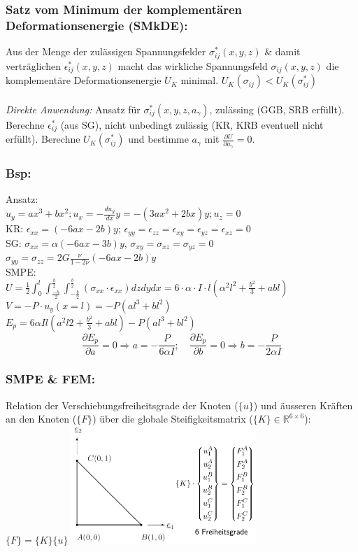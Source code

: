 \documentclass[a4paper,10pt]{article}
\begin{document}
\begin{multicols}{3}
        \subsubsection{Satz vom Minimum der komplementären Deformationsenergie (SMkDE):}
            Aus der Menge der zulässigen Spannungsfelder $\sigma_{ij}^*(x,y,z)$ \& damit verträglichen $\epsilon_{ij}^*(x,y,z)$ macht das wirkliche Spannungsfeld $\sigma_{ij}(x,y,z)$ die komplementäre Deformationsenergie $U_K$ minimal. $U_K(\sigma_{ij}) < U_K(\sigma_{ij}^*)$\\\\
            \textit{Direkte Anwendung:} Ansatz für $\sigma_{ij}^*(x,y,z,a_\gamma)$, zulässing (GGB, SRB erfüllt). Berechne $\epsilon_{ij}^*$ (aus SG), nicht unbedingt zulässig (KR, KRB eventuell nicht erfüllt). Berechne $U_K(\sigma_{ij}^*)$ und bestimme $a_\gamma$ mit $\frac{\partial U}{\partial a_\gamma}=0$.
        \subsubsection{Bsp:}
            Ansatz:\\
            $u_y=ax^3+bx^2; u_x=-\frac{du_y}{dx}y= -(3ax^2+2bx)y; u_z = 0$\\
            KR: $\epsilon_{xx} =(-6ax-2b)y$; $\epsilon_{yy}=\epsilon_{zz}=\epsilon_{xy}=\epsilon_{yz} = \epsilon_{xz}=0$\\
            SG: $\sigma_{xx} = \alpha(-6ax-3b)y$, $\sigma_{xy}=\sigma_{xz}=\sigma_{yz}=0$\\ $\sigma_{yy}=\sigma_{zz}=2G\frac{\nu}{1-2\nu}(-6ax-2b)y$\\
            SMPE:\\
            $U=\frac{1}{2}\int_0^l\int_\frac{-h}{2}^\frac{h}{2}\int_{-\frac{b}{2}}^\frac{b}{2}(\sigma_{xx}\cdot\epsilon_{xx})dzdydx=6\cdot\alpha\cdot I\cdot l(\alpha^2l^2+\frac{b^2}{3}+abl)$\\
            $V=-P\cdot u_y(x=l)=-P(al^3+bl^2)$\\
            $E_p=6\alpha Il(a^2l2+\frac{b^2}{3}+abl)-P(al^3+bl^2)$
            \[\frac{\partial E_p}{\partial a} = 0 \Rightarrow a=-\frac{P}{6\alpha I};\quad\frac{\partial E_p}{\partial b} = 0 \Rightarrow b=-\frac{P}{2\alpha I}\]
        \subsubsection{SMPE \& FEM:}
            Relation der Verschiebungsfreiheitsgrade der Knoten ($\{u\}$) und äusseren Kräften an den Knoten ($\{F\}$) über die globale Steifigkeitsmatrix ($\{K\}\in\mathbb{R}^{6\times6}$): $\{F\}=\{K\}\{u\}$
            \includegraphics[width=70mm]{Dreieckselement}

\end{multicols}
\end{document}
